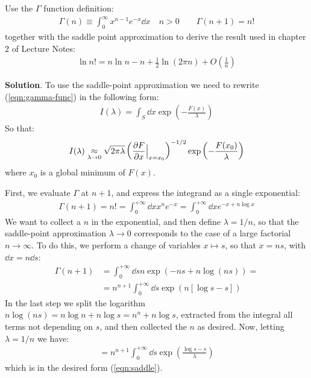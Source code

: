 \documentclass[../template.tex]{subfiles}
\begin{document}
\begin{exo}
    Use the $\Gamma$ function definition:
    \begin{align}
        \Gamma(n) \equiv \int_0^\infty x^{n-1} e^{-x} \dd{x} \quad n > 0\qquad \Gamma(n+1) = n! \label{eqn:gamma-func}
    \end{align}
    together with the saddle point approximation to derive the result used in chapter $2$ of Lecture Notes:
    \begin{align}
        \ln n! = n\ln n - n + \frac{1}{2} \ln(2 \pi n) + O\left(\frac{1}{n} \right) \label{eqn:stirling}
    \end{align} 

    \medskip

    \textbf{Solution}. To use the saddle-point approximation we need to rewrite (\ref{eqn:gamma-func}) in the following form:
    \begin{align}
        I(\lambda) = \int_S \dd{x} \exp\left(-\frac{F(x)}{\lambda} \right)
    \end{align}
    So that:
    \begin{align}
        I(\lambda) \underset{\lambda \to 0}{\approx}  \sqrt{2 \pi \lambda} \left(\pdv{F}{x} (x) \Big|_{x=x_0}\right)^{-1/2} \exp\left(-\frac{F(x_0)}{\lambda} \right)
        \label{eqn:saddle-formula}
    \end{align}
    where $x_0$ is a global minimum of $F(x)$.  

    First, we evaluate $\Gamma$ at $n+1$, and express the integrand as a single exponential:
    \begin{align*}
        \Gamma(n+1) = n! = \int_0^{+\infty} \dd{x} x^n e^{-x}  = \int_{0}^{+\infty} \dd{x} e^{-x + n \log x} 
    \end{align*}
    We want to collect a $n$ in the exponential, and then define $\lambda = 1/n$, so that the saddle-point approximation $\lambda \to 0$ corresponds to the case of a large factorial $n \to \infty$. To do this, we perform a change of variables $x \mapsto s$, so that $x = n s$, with $\dd{x} = n \dd{s}$:
    \begin{align*}
        \Gamma(n+1) &= \int_0^{+\infty} \dd{s} n \exp(-ns + n \log(ns))= \\
        &= n^{n+1} \int_0^{+\infty} \dd{s} \exp(n[\log s - s])
    \end{align*}
    In the last step we split the logarithm $n\log(ns) = n\log n + n\log s = n^n + n\log s$, extracted from the integral all terms not depending on $s$, and then collected the $n$ as desired. Now, letting $\lambda = 1/n$ we have:
    \begin{align*}
        = n^{n+1} \int_0^{+\infty} \dd{s} \exp\left(\frac{\log s - s}{\lambda} \right)
    \end{align*}
    which is in the desired form (\ref{eqn:saddle}).


\end{exo}
\end{document}
